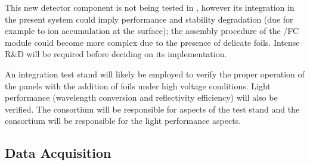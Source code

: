 This new detector component is not being tested in , however its integration in the present   system could imply performance and stability degradation (due for example to ion accumulation at the  surface); the assembly procedure of the /FC module could become more complex due to the presence of delicate  foils. Intense R\&D will be required before deciding on its implementation.

An integration test stand will likely be employed to verify the proper operation of the  panels with the addition of  foils under high voltage conditions. Light performance (wavelength conversion and reflectivity efficiency) will also be verified. The  consortium will be responsible for  aspects of the test stand and the  consortium will be responsible for the light performance aspects.


\subsection{Data Acquisition}
\label{sec:fdsp-pd-intfc-daq}







